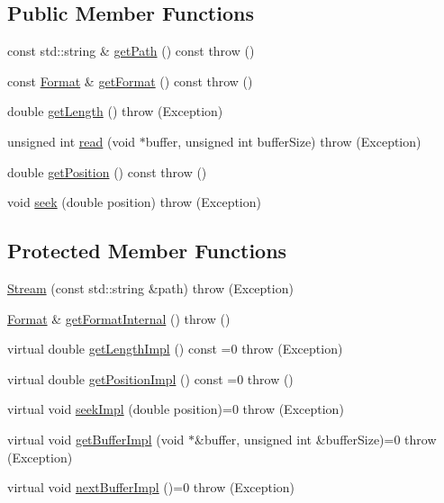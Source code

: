 \subsection*{Public Member Functions}
\begin{DoxyCompactItemize}
\item 
const std\+::string \& \hyperlink{classAudio_1_1Stream_a5046a26c881dfda6025defa46fae5f9d}{get\+Path} () const   throw ()
\item 
const \hyperlink{structAudio_1_1Format}{Format} \& \hyperlink{classAudio_1_1Stream_a63ad175104f2696351cc15f7faf7d22b}{get\+Format} () const   throw ()
\item 
double \hyperlink{classAudio_1_1Stream_a6beb34ff928c420128104e82400d9fd3}{get\+Length} ()  throw (\+Exception)
\item 
unsigned int \hyperlink{classAudio_1_1Stream_afad484dadc6c02def4277a667dc05327}{read} (void $\ast$buffer, unsigned int buffer\+Size)  throw (\+Exception)
\item 
double \hyperlink{classAudio_1_1Stream_ab1f7f84931d20af5509c674c5c878788}{get\+Position} () const   throw ()
\item 
void \hyperlink{classAudio_1_1Stream_a5edea4e4a4d7c7569f12bc8f2a913aa0}{seek} (double position)  throw (\+Exception)
\end{DoxyCompactItemize}
\subsection*{Protected Member Functions}
\begin{DoxyCompactItemize}
\item 
\hyperlink{classAudio_1_1Stream_a96b205b8b9d085ffcdd955d62171588b}{Stream} (const std\+::string \&path)  throw (\+Exception)
\item 
\hyperlink{structAudio_1_1Format}{Format} \& \hyperlink{classAudio_1_1Stream_aea9aa3af028096aa7657933997e266b7}{get\+Format\+Internal} ()  throw ()
\item 
virtual double \hyperlink{classAudio_1_1Stream_a02c5f29ebc51834724acb403a4680526}{get\+Length\+Impl} () const =0  throw (\+Exception)
\item 
virtual double \hyperlink{classAudio_1_1Stream_abd7c2b572f0432f22ffdcad4ca60d0f7}{get\+Position\+Impl} () const =0  throw ()
\item 
virtual void \hyperlink{classAudio_1_1Stream_a1e37ef0d6f53d1dd312f91413b840222}{seek\+Impl} (double position)=0  throw (\+Exception)
\item 
virtual void \hyperlink{classAudio_1_1Stream_a9e751b39449a3cfe0aa6579cdba43e65}{get\+Buffer\+Impl} (void $\ast$\&buffer, unsigned int \&buffer\+Size)=0  throw (\+Exception)
\item 
virtual void \hyperlink{classAudio_1_1Stream_a3efb4fa10e2a575805d9f8be9a133b6f}{next\+Buffer\+Impl} ()=0  throw (\+Exception)
\end{DoxyCompactItemize}


